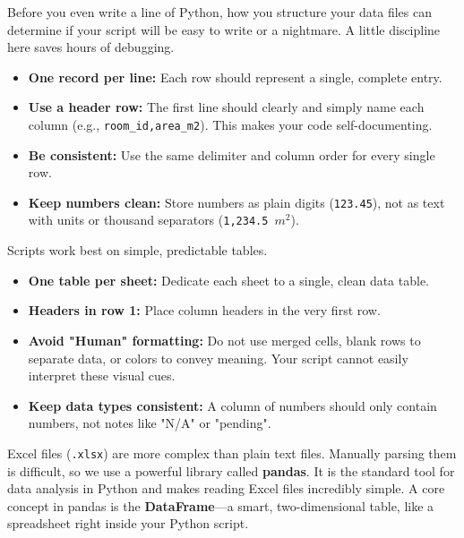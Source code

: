 
Before you even write a line of Python, how you structure your data files can determine if your script will be easy to write or a nightmare. A little discipline here saves hours of debugging.

\begin{itemize}
    \item \textbf{One record per line:} Each row should represent a single, complete entry.
    \item \textbf{Use a header row:} The first line should clearly and simply name each column (e.g., \texttt{room\_id,area\_m2}). This makes your code self-documenting.
    \item \textbf{Be consistent:} Use the same delimiter and column order for every single row.
    \item \textbf{Keep numbers clean:} Store numbers as plain digits (\texttt{123.45}), not as text with units or thousand separators (\texttt{1,234.5 $m^2$}).
\end{itemize}

Scripts work best on simple, predictable tables.
\begin{itemize}
    \item \textbf{One table per sheet:} Dedicate each sheet to a single, clean data table.
    \item \textbf{Headers in row 1:} Place column headers in the very first row.
    \item \textbf{Avoid "Human" formatting:} Do not use merged cells, blank rows to separate data, or colors to convey meaning. Your script cannot easily interpret these visual cues.
    \item \textbf{Keep data types consistent:} A column of numbers should only contain numbers, not notes like "N/A" or "pending".
\end{itemize}


Excel files (\texttt{.xlsx}) are more complex than plain text files. Manually parsing them is difficult, so we use a powerful library called \textbf{pandas}. It is the standard tool for data analysis in Python and makes reading Excel files incredibly simple. A core concept in pandas is the \textbf{DataFrame}---a smart, two-dimensional table, like a spreadsheet right inside your Python script.

